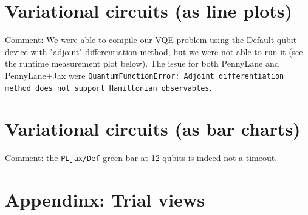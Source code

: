 \documentclass{article}
\renewcommand{\t}[1]{\texttt{#1}}
\newcommand{\SYSHASH}{628f56}
\newcommand{\TAG}{1003}
\newcommand{\bmimage}[1]{
    \begin{center}
    
    \end{center}}
\begin{document}
\bmimage{deep_compile}

\bmimage{deep_runtime}

\pagebreak
\section{Variational circuits (as line plots)}

\bmimage{variational_compile_adjoint_lineplot}

Comment: We were able to compile our VQE problem using the Default qubit device with "adjoint"
differentiation method, but we were not able to run it (see the runtime measurement plot below). The
issue for both PennyLane and PennyLane+Jax were \t{QuantumFunctionError: Adjoint
differentiation method does not support Hamiltonian observables}.

\bmimage{variational_compile_backprop_lineplot}

\bmimage{variational_compile_finitediff_lineplot}

\bmimage{variational_compile_parametershift_lineplot}

\pagebreak

\bmimage{variational_runtime_adjoint_lineplot}

\bmimage{variational_runtime_backprop_lineplot}

\bmimage{variational_runtime_finitediff_lineplot}

\bmimage{variational_runtime_parametershift_lineplot}

\pagebreak
\section{Variational circuits (as bar charts)}

\bmimage{variational_runtime_adjoint}

\bmimage{variational_runtime_backprop}

\bmimage{variational_runtime_finitediff}

\bmimage{variational_runtime_parametershift}

Comment: the \t{PLjax/Def} green bar at 12 qubits is indeed not a timeout.

\pagebreak
\section{Appendinx: Trial views}

\bmimage{regular_compile_trial}

\bmimage{regular_runtime_trial}
\end{document}

